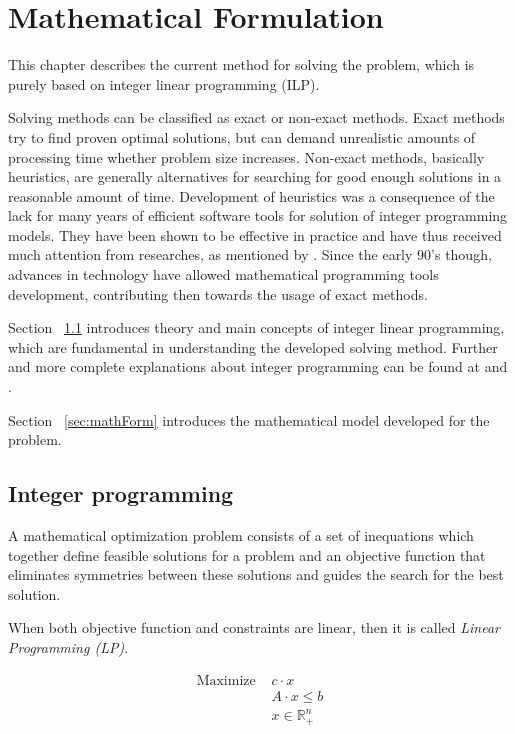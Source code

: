 \chapter{Mathematical Formulation}
\label{chap:mipformulation}



This chapter describes the current method for solving the problem, which is purely based on integer linear programming (ILP).

Solving methods can be classified as exact or non-exact methods. Exact methods try to find proven optimal solutions, but can demand unrealistic amounts of processing time whether problem size increases. Non-exact methods, basically heuristics, are generally alternatives for searching for good enough solutions in a reasonable amount of time. Development of heuristics was a consequence of the lack for many years of efficient software tools for solution of integer programming models. They have been shown to be effective in practice and have thus received much attention from researches, as mentioned by \cite{Haroldo2012}. Since the early 90's though, advances in technology have allowed mathematical programming tools development, contributing then towards the usage of exact methods.

Section ~\ref{sec:IP} introduces theory and main concepts of integer linear programming, which are fundamental in understanding the developed solving method. Further and more complete explanations about integer programming can be found at \cite{Wolsey98} and \cite{Papa98}.

Section ~\ref{sec:mathForm} introduces the mathematical model developed for the problem.

\section{Integer programming}
\label{sec:IP}

A mathematical optimization problem consists of a set of inequations which together define feasible solutions for a problem and an objective function that eliminates symmetries between these solutions and guides the search for the best solution.

When both objective function and constraints are linear, then it is called \textit{Linear Programming (LP)}.

\begin{subequations}
\label{eq:LP}
\begin{align}
   \mbox{Maximize } & c \cdot x
								\\ & A \cdot x \le b
								\\ & x \in \mathbb{R}^{n}_{+}
\end{align}
\end{subequations}

